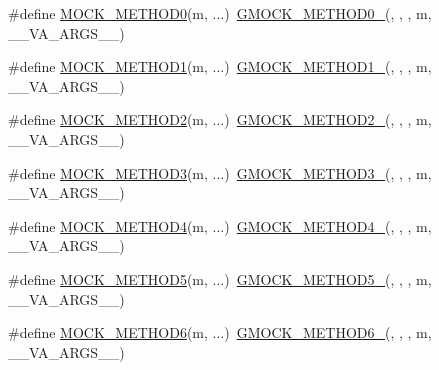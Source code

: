 \begin{DoxyCompactItemize}
\item 
\#define \mbox{\hyperlink{gmock-generated-function-mockers_8h_a411c69e9d489d590480f728d365ae450}{M\+O\+C\+K\+\_\+\+M\+E\+T\+H\+O\+D0}}(m, ...)~\mbox{\hyperlink{gmock-generated-function-mockers_8h_ae0d290ffa58d7c624b2e3487ba1252f4}{G\+M\+O\+C\+K\+\_\+\+M\+E\+T\+H\+O\+D0\+\_\+}}(, , , m, \+\_\+\+\_\+\+V\+A\+\_\+\+A\+R\+G\+S\+\_\+\+\_\+)
\item 
\#define \mbox{\hyperlink{gmock-generated-function-mockers_8h_ac49d366be035ee87b73264a29059cdc7}{M\+O\+C\+K\+\_\+\+M\+E\+T\+H\+O\+D1}}(m, ...)~\mbox{\hyperlink{gmock-generated-function-mockers_8h_a1bc0012d62440dda77208dabdf4925c9}{G\+M\+O\+C\+K\+\_\+\+M\+E\+T\+H\+O\+D1\+\_\+}}(, , , m, \+\_\+\+\_\+\+V\+A\+\_\+\+A\+R\+G\+S\+\_\+\+\_\+)
\item 
\#define \mbox{\hyperlink{gmock-generated-function-mockers_8h_ab3fb7d97f21dc99205db38a14df4a1c4}{M\+O\+C\+K\+\_\+\+M\+E\+T\+H\+O\+D2}}(m, ...)~\mbox{\hyperlink{gmock-generated-function-mockers_8h_a885295ca6bebb15efb3fc786218c5d47}{G\+M\+O\+C\+K\+\_\+\+M\+E\+T\+H\+O\+D2\+\_\+}}(, , , m, \+\_\+\+\_\+\+V\+A\+\_\+\+A\+R\+G\+S\+\_\+\+\_\+)
\item 
\#define \mbox{\hyperlink{gmock-generated-function-mockers_8h_af11ebf7fafb231778846dba77725cfdd}{M\+O\+C\+K\+\_\+\+M\+E\+T\+H\+O\+D3}}(m, ...)~\mbox{\hyperlink{gmock-generated-function-mockers_8h_af7c77ba511c631de02bb8c45a6ed3045}{G\+M\+O\+C\+K\+\_\+\+M\+E\+T\+H\+O\+D3\+\_\+}}(, , , m, \+\_\+\+\_\+\+V\+A\+\_\+\+A\+R\+G\+S\+\_\+\+\_\+)
\item 
\#define \mbox{\hyperlink{gmock-generated-function-mockers_8h_a111d70ee62b09089ec3cd7d6662e5cd2}{M\+O\+C\+K\+\_\+\+M\+E\+T\+H\+O\+D4}}(m, ...)~\mbox{\hyperlink{gmock-generated-function-mockers_8h_ab6430f2cfad9de4aca5258ea559294bb}{G\+M\+O\+C\+K\+\_\+\+M\+E\+T\+H\+O\+D4\+\_\+}}(, , , m, \+\_\+\+\_\+\+V\+A\+\_\+\+A\+R\+G\+S\+\_\+\+\_\+)
\item 
\#define \mbox{\hyperlink{gmock-generated-function-mockers_8h_a9b83bed95e89664e61d3a36174de0052}{M\+O\+C\+K\+\_\+\+M\+E\+T\+H\+O\+D5}}(m, ...)~\mbox{\hyperlink{gmock-generated-function-mockers_8h_a9e3ecd392499ab19a4a6d3adcabf56f6}{G\+M\+O\+C\+K\+\_\+\+M\+E\+T\+H\+O\+D5\+\_\+}}(, , , m, \+\_\+\+\_\+\+V\+A\+\_\+\+A\+R\+G\+S\+\_\+\+\_\+)
\item 
\#define \mbox{\hyperlink{gmock-generated-function-mockers_8h_add8f8f786444c2c85ac67f550dbde5a6}{M\+O\+C\+K\+\_\+\+M\+E\+T\+H\+O\+D6}}(m, ...)~\mbox{\hyperlink{gmock-generated-function-mockers_8h_ad0ca7f6973a076d0af4c953f8ed91842}{G\+M\+O\+C\+K\+\_\+\+M\+E\+T\+H\+O\+D6\+\_\+}}(, , , m, \+\_\+\+\_\+\+V\+A\+\_\+\+A\+R\+G\+S\+\_\+\+\_\+)

\end{DoxyCompactItemize}
